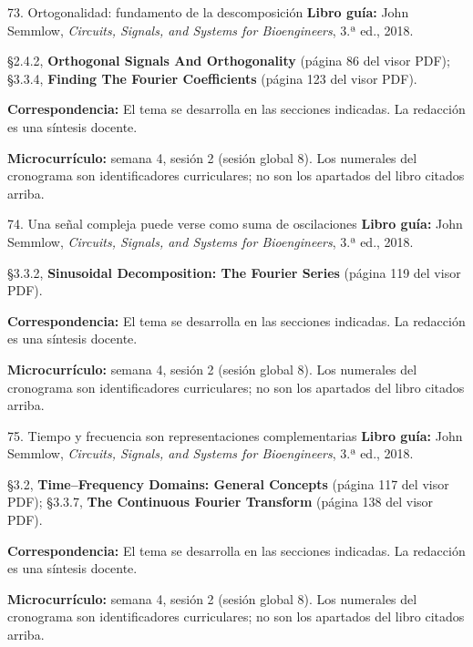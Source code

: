 \documentclass[
  10pt,
  ignorenonframetext,
  aspectratio=169,
  spanish,
]{beamer}
\begin{document}
\begin{frame}{73. Ortogonalidad: fundamento de la descomposición}
\label{ortogonalidad-fundamento-de-la-descomposiciuxf3n}
\textbf{Libro guía:} John Semmlow, \emph{Circuits, Signals, and Systems
for Bioengineers}, 3.ª ed., 2018.

§2.4.2, \textbf{Orthogonal Signals And Orthogonality} (página 86 del
visor PDF); §3.3.4, \textbf{Finding The Fourier Coefficients} (página
123 del visor PDF).

\textbf{Correspondencia:} El tema se desarrolla en las secciones
indicadas. La redacción es una síntesis docente.

\textbf{Microcurrículo:} semana 4, sesión 2 (sesión global 8). Los
numerales del cronograma son identificadores curriculares; no son los
apartados del libro citados arriba.
\end{frame}

\begin{frame}{74. Una señal compleja puede verse como suma de
oscilaciones}
\label{una-seuxf1al-compleja-puede-verse-como-suma-de-oscilaciones}
\textbf{Libro guía:} John Semmlow, \emph{Circuits, Signals, and Systems
for Bioengineers}, 3.ª ed., 2018.

§3.3.2, \textbf{Sinusoidal Decomposition: The Fourier Series} (página
119 del visor PDF).

\textbf{Correspondencia:} El tema se desarrolla en las secciones
indicadas. La redacción es una síntesis docente.

\textbf{Microcurrículo:} semana 4, sesión 2 (sesión global 8). Los
numerales del cronograma son identificadores curriculares; no son los
apartados del libro citados arriba.
\end{frame}

\begin{frame}{75. Tiempo y frecuencia son representaciones
complementarias}
\label{tiempo-y-frecuencia-son-representaciones-complementarias}
\textbf{Libro guía:} John Semmlow, \emph{Circuits, Signals, and Systems
for Bioengineers}, 3.ª ed., 2018.

§3.2, \textbf{Time--Frequency Domains: General Concepts} (página 117 del
visor PDF); §3.3.7, \textbf{The Continuous Fourier Transform} (página
138 del visor PDF).

\textbf{Correspondencia:} El tema se desarrolla en las secciones
indicadas. La redacción es una síntesis docente.

\textbf{Microcurrículo:} semana 4, sesión 2 (sesión global 8). Los
numerales del cronograma son identificadores curriculares; no son los
apartados del libro citados arriba.
\end{frame}
\end{document}
